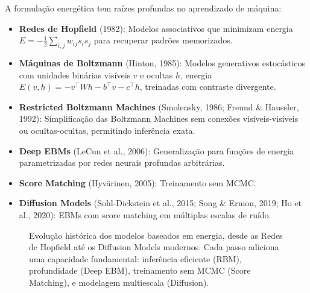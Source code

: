 \documentclass{tufte-handout}
\begin{document}
A formulação energética tem raízes profundas no aprendizado de máquina:

\begin{itemize}
    \item \textbf{Redes de Hopfield} (1982): Modelos associativos que minimizam energia $E = -\frac{1}{2} \sum_{i,j} w_{ij} s_i s_j$ para recuperar padrões memorizados.
    \item \textbf{Máquinas de Boltzmann} (Hinton, 1985): Modelos generativos estocásticos com unidades binárias visíveis $v$ e ocultas $h$, energia $E(v, h) = -v^\top W h - b^\top v - c^\top h$, treinadas com contraste divergente.
    \item \textbf{Restricted Boltzmann Machines} (Smolensky, 1986; Freund \& Haussler, 1992): Simplificação das Boltzmann Machines sem conexões visíveis-visíveis ou ocultas-ocultas, permitindo inferência exata.
    \item \textbf{Deep EBMs} (LeCun et al., 2006): Generalização para funções de energia parametrizadas por redes neurais profundas arbitrárias.
    \item \textbf{Score Matching} (Hyvärinen, 2005): Treinamento sem MCMC.
    \item \textbf{Diffusion Models} (Sohl-Dickstein et al., 2015; Song \& Ermon, 2019; Ho et al., 2020): EBMs com score matching em múltiplas escalas de ruído.
\end{itemize}

\begin{figure}[htbp]
\centering
{}
\caption{Evolução histórica dos modelos baseados em energia, desde as Redes de Hopfield até os Diffusion Models modernos. Cada passo adiciona uma capacidade fundamental: inferência eficiente (RBM), profundidade (Deep EBM), treinamento sem MCMC (Score Matching), e modelagem multiescala (Diffusion).}
\label{fig:ebm-tree}
\end{figure}
\end{document}
